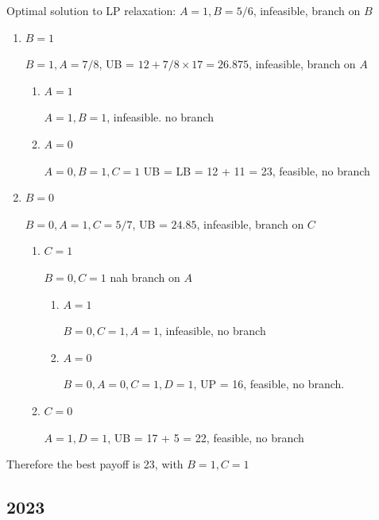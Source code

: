 \documentclass[10pt]{article}
\begin{document}
Optimal solution to LP relaxation: $A = 1, B = 5/6 $, infeasible, branch on $B $
\begin{enumerate}
\item $B = 1 $

    $B = 1, A = 7/8 $, UB = $12 + 7/8\times 17 = 26.875 $, infeasible, branch on $A $
    \begin{enumerate}
        \item $A = 1 $

        $A = 1, B = 1 $, infeasible. no branch
        \item $A = 0 $

        $A = 0, B = 1, C = 1 $ UB = LB = 12 + 11 = 23, feasible, no branch
    \end{enumerate}
    \item $B = 0 $

    $B = 0, A = 1, C = 5/7 $, UB = $24.85 $, infeasible, branch on $C $
    \begin{enumerate}
        \item $C = 1 $

        $B = 0, C = 1 $ nah branch on $A $
        \begin{enumerate}
            \item $A = 1 $

            $B = 0, C = 1, A = 1 $, infeasible, no branch 
            \item $A = 0 $

            $B = 0, A = 0, C = 1, D = 1 $, UP = 16, feasible, no branch. 
        \end{enumerate}

        \item $C = 0 $

        $A = 1, D = 1 $, UB = 17 + 5 = 22, feasible, no branch 
    \end{enumerate}
\end{enumerate}
Therefore the best payoff is 23, with $B = 1, C = 1 $
\newpage
\subsection{2023}
\end{document}

